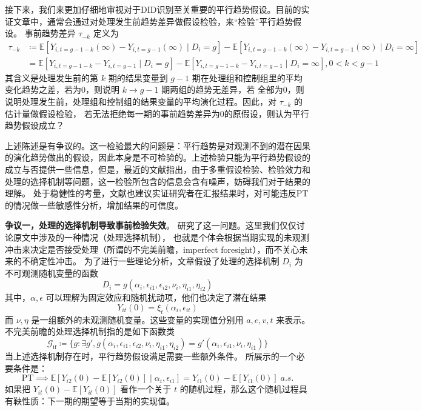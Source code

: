 \documentclass[../didNotes.tex]{subfiles}
\begin{document}
接下来，我们来更加仔细地审视对于DID识别至关重要的平行趋势假设。目前的实证文章中，通常会通过对处理发生前趋势差异做假设检验，来``检验''平行趋势假设。
事前趋势差异 $\tau_{-k}$ 定义为
\begin{align*}
  \tau_{-k} &\coloneqq \mathbb{E}[Y_{i,t=g-1-k}(\infty)-Y_{i,t=g-1}(\infty) \mid D_i = g] -
  \mathbb{E}[Y_{i,t=g-1-k}(\infty)-Y_{i,t=g-1}(\infty) \mid D_i = \infty] \\
  &= \mathbb{E}[Y_{i,t=g-1-k}-Y_{i,t=g-1} \mid D_i = g] -
  \mathbb{E}[Y_{i,t=g-1-k}-Y_{i,t=g-1} \mid D_i = \infty], 0 < k < g-1
\end{align*}
其含义是处理发生前的第 $k$ 期的结果变量到 $g-1$ 期在处理组和控制组里的平均变化趋势之差，若为0，则说明 $k \to g-1$ 期两组的趋势无差异，若
全部为0，则说明处理发生前，处理组和控制组的结果变量的平均演化过程。因此，对 $\tau_{-k}$ 的估计量做假设检验，
若无法拒绝每一期的事前趋势差异为0的原假设，则认为平行趋势假设成立？

上述陈述是有争议的。这一检验最大的问题是：平行趋势是对观测不到的潜在因果的演化趋势做出的假设，因此本身是不可检验的。上述检验只能为平行趋势假设的
成立与否提供一些信息，但是，最近的文献指出，由于多重假设检验、检验效力和处理的选择机制等问题，这一检验所包含的信息会含有噪声，妨碍我们对于结果的理解。
处于稳健性的考量，文献也建议实证研究者在汇报结果时，对可能违反PT的情况做一些敏感性分析，增加结果的可信度。

\textbf{争议一，处理的选择机制导致事前检验失效}。\textcite{ghanem2025} 研究了这一问题。这里我们仅仅讨论原文中涉及的一种情况（处理选择机制），
也就是个体会根据当期实现的未观测冲击来决定是否接受处理（所谓的不完美前瞻，imperfect foresight），而不关心未来的不确定性冲击。
为了进行一些理论分析，文章假设了处理的选择机制 $D_{i}$ 为不可观测随机变量的函数
$$
D_{i} = g(\alpha_{i},\epsilon_{i 1}, \epsilon_{i 2}, \nu_{i}, \eta_{i 1}, \eta_{i 2})
$$
其中，$\alpha, \epsilon$ 可以理解为固定效应和随机扰动项，他们也决定了潜在结果
$$
Y_{i t}(0) = \xi_{t}(\alpha_{i}, \epsilon_{i t})
$$
而 $\nu,\eta$ 是一组额外的未观测随机变量。这些变量的实现值分别用 $a,e,v,t$ 来表示。不完美前瞻的处理选择机制指的是如下函数类
$$
\mathcal{G}_{\text{if}} \coloneqq \{ g: \exists g', g(\alpha_{i},\epsilon_{i 1}, \epsilon_{i 2}, \nu_{i},
\eta_{i 1}, \eta_{i 2}) = g'(\alpha_{i},\epsilon_{i 1}, \nu_{i}, \eta_{i 1}) \}
$$
当上述选择机制存在时，平行趋势假设满足需要一些额外条件。\textcite{ghanem2025} 所展示的一个必要条件是：
$$
\text{PT} \implies \mathbb{E}[Y_{i 2}(0)-\mathbb{E}[Y_{i 2}(0)] \mid \alpha_{i},\epsilon_{i 1}] = Y_{i
1}(0)-\mathbb{E}[Y_{i 1}(0)] \; \textit{a.s.}
$$
如果把 $Y_{i t}(0) - \mathbb{E}[Y_{i t}(0)]$ 看作一个关于 $t$ 的随机过程，那么这个随机过程具有鞅性质：下一期的期望等于当期的实现值。
\end{document}
